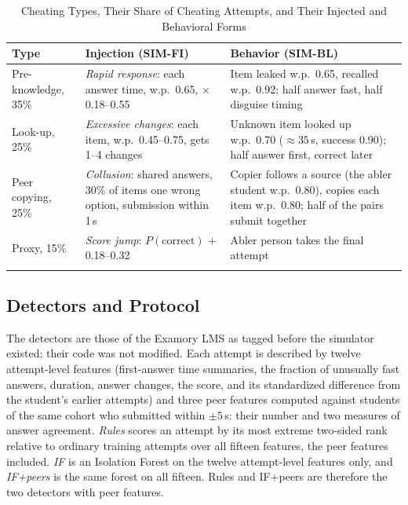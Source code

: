 \documentclass[conference,a4paper]{IEEEtran}
\begin{document}
\begin{table}[t]
\caption{Cheating Types, Their Share of Cheating Attempts, and Their Injected and Behavioral Forms}
\label{tab:types}
\centering
\footnotesize
\setlength{\tabcolsep}{3pt}
\renewcommand{\arraystretch}{1.05}
\begin{tabular}{@{}>{\raggedright\arraybackslash}p{}>{\raggedright\arraybackslash}p{}>{\raggedright\arraybackslash}p{}@{}}
\toprule
Type & Injection (SIM-FI) & Behavior (SIM-BL) \\
\midrule
Pre-know\-ledge, 35\% & \emph{Rapid response}: each answer time, w.p.\ 0.65, $\times$0.18--0.55 & Item leaked w.p.\ 0.65, recalled w.p.\ 0.92; half answer fast, half disguise timing \\
Look-up, 25\% & \emph{Excessive changes}: each item, w.p.\ 0.45--0.75, gets 1--4 changes & Unknown item looked up w.p.\ 0.70 (${\approx}35$\,s, success 0.90); half answer first, correct later \\
Peer copying, 25\% & \emph{Collusion}: shared answers, 30\% of items one wrong option, submission within 1\,s & Copier follows a source (the abler student w.p.\ 0.80), copies each item w.p.\ 0.80; half of the pairs submit together \\
Proxy, 15\% & \emph{Score jump}: $P(\text{correct})$ $+$0.18--0.32 & Abler person takes the final attempt \\
\bottomrule
\multicolumn{3}{@{}l}{w.p.: with probability.}
\end{tabular}
\end{table}

\subsection{Detectors and Protocol}
The detectors are those of the Examory LMS as tagged before the simulator existed; their code was not modified. Each attempt is described by twelve attempt-level features (first-answer time summaries, the fraction of unusually fast answers, duration, answer changes, the score, and its standardized difference from the student's earlier attempts) and three peer features computed against students of the same cohort who submitted within $\pm 5$\,s: their number and two measures of answer agreement. \emph{Rules} scores an attempt by its most extreme two-sided rank relative to ordinary training attempts over all fifteen features, the peer features included. \emph{IF} is an Isolation Forest \cite{liu2008isolation} on the twelve attempt-level features only, and \emph{IF+peers} is the same forest on all fifteen. Rules and IF+peers are therefore the two detectors with peer features.
\end{document}
